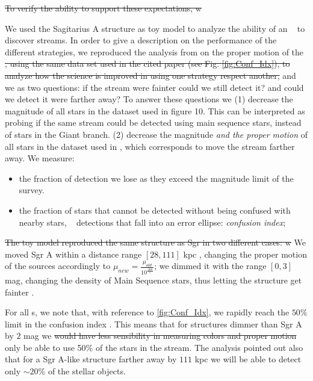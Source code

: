 \sout{ To verify the ability to support these expectations, w}

We used the Sagitarius A structure as toy model to analyze the ability of an \opsim~ to discover streams. In order to give a description on the performance of the different strategies, we reproduced the analysis from \citealt{Carlin12} on the proper motion of the  \sout{, using the same data set used in the cited paper (see Fig. \ref{fig:Conf_Idx}), to analyze how the science is improved in using one strategy respect another,} and we as two questions: if the stream were fainter could we still detect it? and could we detect it were farther away? To answer these questions we (1) decrease the magnitude of all stars in the dataset used in \citet{Carlin12} figure 10. This can be interpreted as probing if the same stream could be detected using main sequence stars, instead of stars in the Giant branch. (2) decrease the magnitude \emph{and the proper motion} of all stars in the dataset used in \citealt{Carlin12}, which corresponds to move the stream farther away. We measure:

\begin{itemize}
    \item the fraction of detection we lose as they exceed the magnitude limit of the survey.
    \item the fraction of stars that cannot be detected without being confused with nearby stars, \ie~ detections that fall into an error ellipse: \emph{confusion index};
    
\end{itemize}

\sout{The toy model reproduced the same structure as Sgr in two different cases:  w} We moved Sgr A  within a distance range $[28,111]$ kpc , changing the proper motion of the sources accordingly to $\mu_{new}=\frac{\mu_{old}}{10^{\frac{\Delta m}{5}}}$; we dimmed it with the range $[0,3]$ mag, changing the density of Main Sequence stars, thus letting the structure get fainter . 

For all \opsim s, we note that, with reference to  \autoref{fig:Conf_Idx}, we rapidly reach the $50\%$ limit in the confusion index . This means that for structures dimmer than Sgr A by $2$ mag we \sout{would have less sensibility in measuring colors and proper motion} only be able to use 50\% of the stars in the stream. The analysis pointed out also that for a Sgr A-like structure farther away by $111$ kpc we will be able to detect only   $\sim20\%$ of the stellar objects. 


